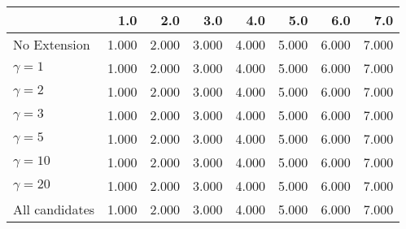 \begin{tabular}{lrrrrrrr}
\toprule
{} &   1.0 &   2.0 &   3.0 &   4.0 &   5.0 &   6.0 &   7.0 \\
\midrule
No Extension   & 1.000 & 2.000 & 3.000 & 4.000 & 5.000 & 6.000 & 7.000 \\
$\gamma = 1$   & 1.000 & 2.000 & 3.000 & 4.000 & 5.000 & 6.000 & 7.000 \\
$\gamma = 2$   & 1.000 & 2.000 & 3.000 & 4.000 & 5.000 & 6.000 & 7.000 \\
$\gamma = 3$   & 1.000 & 2.000 & 3.000 & 4.000 & 5.000 & 6.000 & 7.000 \\
$\gamma = 5$   & 1.000 & 2.000 & 3.000 & 4.000 & 5.000 & 6.000 & 7.000 \\
$\gamma = 10$  & 1.000 & 2.000 & 3.000 & 4.000 & 5.000 & 6.000 & 7.000 \\
$\gamma = 20$  & 1.000 & 2.000 & 3.000 & 4.000 & 5.000 & 6.000 & 7.000 \\
All candidates & 1.000 & 2.000 & 3.000 & 4.000 & 5.000 & 6.000 & 7.000 \\
\bottomrule
\end{tabular}

